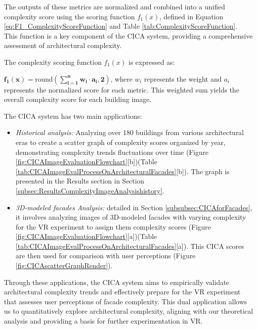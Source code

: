 The outputs of these metrics are normalized and combined into a unified complexity score using the scoring function \(f_1(x)\), defined in Equation \ref{eq:F1_ComplexityScoreFunction} and Table \ref{tab:ComplexityScoreFunction}.
This function is a key component of the CICA system, providing a comprehensive assessment of architectural complexity.

The complexity scoring function \(f_1(x)\) is expressed as:

\(\mathbf{f_1(x) = \mathrm{round}\left(\sum_{i=1}^{n} w_i \cdot a_i, 2\right)}\),
where \(w_i\) represents the weight and \(a_i\) represents the normalized score for each metric.
This weighted sum yields the overall complexity score for each building image.

The CICA system has two main applications:
\begin{itemize}
    \item \textit{Historical analysis:}  Analyzing over 180 buildings from various architectural eras to create a scatter graph of complexity scores organized by year, demonstrating complexity trends fluctuations over time (Figure \ref{fig:CICAImageEvaluationFlowchart}[b])(Table \ref{tab:CICAImageEvalProcessOnArchitecturalFacades}[b]). The graph is presented in the Results section in Section \ref{subsec:ResultsComplexityImageAnalysishistory}.
    \item \textit{3D-modeled facades Analysis:} detailed in Section \ref{subsubsec:CICAforFacades}, it involves analyzing images of 3D-modeled facades with varying complexity for the VR experiment  to assign them complexity scores (Figure \ref{fig:CICAImageEvaluationFlowchart}[a])(Table \ref{tab:CICAImageEvalProcessOnArchitecturalFacades}[a]). This CICA scores are then used for comparison with user perceptions (Figure \ref{fig:CICAscatterGraphRender}).
\end{itemize}

Through these applications, the CICA system aims to empirically validate architectural complexity trends and effectively prepare for the VR experiment that assesses user perceptions of facade complexity.
This dual application allows us to quantitatively explore architectural complexity, aligning with our theoretical analysis and providing a basis for further experimentation in VR.


